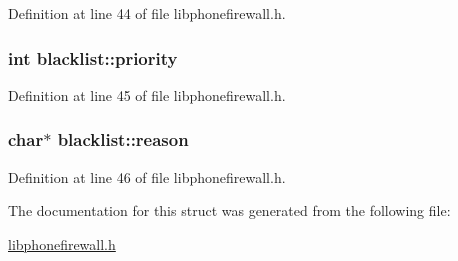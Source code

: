 Definition at line 44 of file libphonefirewall.h.\hypertarget{structblacklist_9586b7070a0df1baf14e4b8e596f5517}{
\subsubsection{\setlength{\rightskip}{0pt plus 5cm}int {\bf blacklist::priority}}}
\label{structblacklist_9586b7070a0df1baf14e4b8e596f5517}




Definition at line 45 of file libphonefirewall.h.\hypertarget{structblacklist_4fa8b22fda997489930f8dd10dd72be0}{
\subsubsection{\setlength{\rightskip}{0pt plus 5cm}char$\ast$ {\bf blacklist::reason}}}
\label{structblacklist_4fa8b22fda997489930f8dd10dd72be0}




Definition at line 46 of file libphonefirewall.h.

The documentation for this struct was generated from the following file:\begin{CompactItemize}
\item 
\hyperlink{libphonefirewall_8h}{libphonefirewall.h}\end{CompactItemize}
